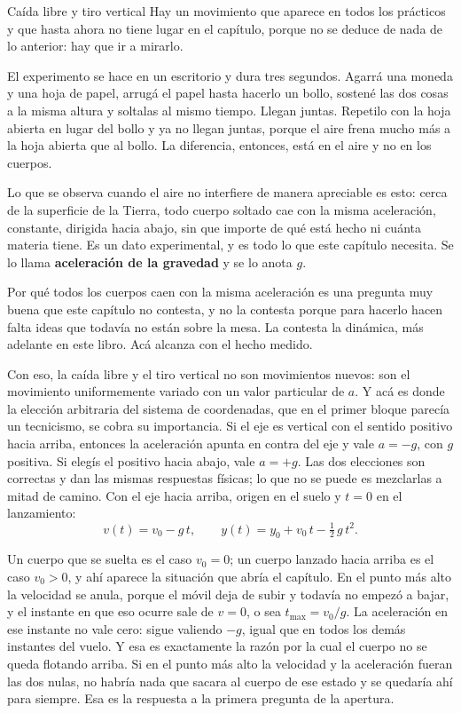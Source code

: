 \documentclass[11pt,openany]{book}
\begin{document}
\begin{bloque}{Caída libre y tiro vertical}
Hay un movimiento que aparece en todos los prácticos y que hasta ahora no tiene lugar en el capítulo, porque no se deduce de nada de lo anterior: hay que ir a mirarlo.

El experimento se hace en un escritorio y dura tres segundos. Agarrá una moneda y una hoja de papel, arrugá el papel hasta hacerlo un bollo, sostené las dos cosas a la misma altura y soltalas al mismo tiempo. Llegan juntas. Repetilo con la hoja abierta en lugar del bollo y ya no llegan juntas, porque el aire frena mucho más a la hoja abierta que al bollo. La diferencia, entonces, está en el aire y no en los cuerpos.

Lo que se observa cuando el aire no interfiere de manera apreciable es esto: cerca de la superficie de la Tierra, todo cuerpo soltado cae con la misma aceleración, constante, dirigida hacia abajo, sin que importe de qué está hecho ni cuánta materia tiene. Es un dato experimental, y es todo lo que este capítulo necesita. Se lo llama \textbf{aceleración de la gravedad} y se lo anota $g$.

Por qué todos los cuerpos caen con la misma aceleración es una pregunta muy buena que este capítulo no contesta, y no la contesta porque para hacerlo hacen falta ideas que todavía no están sobre la mesa. La contesta la dinámica, más adelante en este libro. Acá alcanza con el hecho medido.

Con eso, la caída libre y el tiro vertical no son movimientos nuevos: son el movimiento uniformemente variado con un valor particular de $a$. Y acá es donde la elección arbitraria del sistema de coordenadas, que en el primer bloque parecía un tecnicismo, se cobra su importancia. Si el eje es vertical con el sentido positivo hacia arriba, entonces la aceleración apunta en contra del eje y vale $a=-g$, con $g$ positiva. Si elegís el positivo hacia abajo, vale $a=+g$. Las dos elecciones son correctas y dan las mismas respuestas físicas; lo que no se puede es mezclarlas a mitad de camino. Con el eje hacia arriba, origen en el suelo y $t=0$ en el lanzamiento:
\[
v(t) = v_0 - g\,t, \qquad y(t) = y_0 + v_0\,t - \tfrac12\,g\,t^2.
\]

Un cuerpo que se suelta es el caso $v_0 = 0$; un cuerpo lanzado hacia arriba es el caso $v_0 > 0$, y ahí aparece la situación que abría el capítulo. En el punto más alto la velocidad se anula, porque el móvil deja de subir y todavía no empezó a bajar, y el instante en que eso ocurre sale de $v=0$, o sea $t_{\text{max}} = v_0/g$. La aceleración en ese instante no vale cero: sigue valiendo $-g$, igual que en todos los demás instantes del vuelo. Y esa es exactamente la razón por la cual el cuerpo no se queda flotando arriba. Si en el punto más alto la velocidad y la aceleración fueran las dos nulas, no habría nada que sacara al cuerpo de ese estado y se quedaría ahí para siempre. Esa es la respuesta a la primera pregunta de la apertura.


\end{bloque}
\end{document}
